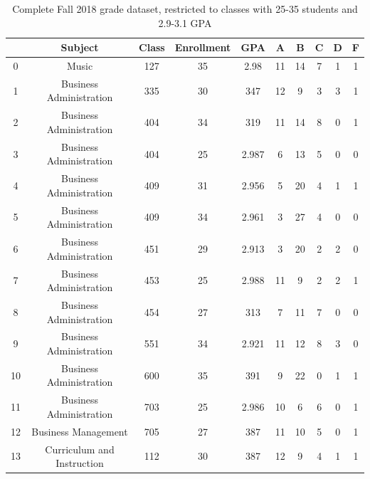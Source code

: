 \documentclass[12pt,letterpaper,oneside,openany]{book}
\begin{document}
\begin{center}
	
	\begin{longtable}{c||ccccccccc}
		\caption{Complete Fall 2018 grade dataset, restricted to classes with 25-35 students and 2.9-3.1 GPA} \\
		\label{tab:fullfall2018} 
		& Subject               & Class & Enrollment & GPA   & A    & B    & C   & D   & F   \\ \hline
		\endfirsthead
		\endhead
		0  & Music                           & 127   & 35                & 2.98  & 11 & 14 & 7 & 1 & 1 \\
		1  & Business Administration         & 335   & 30                & 347 & 12 & 9  & 3 & 3 & 1 \\
		2  & Business Administration         & 404   & 34                & 319 & 11 & 14 & 8 & 0 & 1 \\
		3  & Business Administration         & 404   & 25                & 2.987 & 6  & 13 & 5 & 0 & 0 \\
		4  & Business Administration         & 409   & 31                & 2.956 & 5  & 20 & 4 & 1 & 1 \\
		5  & Business Administration         & 409   & 34                & 2.961 & 3  & 27 & 4 & 0 & 0 \\
		6  & Business Administration         & 451   & 29                & 2.913 & 3  & 20 & 2 & 2 & 0 \\
		7  & Business Administration         & 453   & 25                & 2.988 & 11 & 9  & 2 & 2 & 1 \\
		8  & Business Administration         & 454   & 27                & 313 & 7  & 11 & 7 & 0 & 0 \\
		9  & Business Administration         & 551   & 34                & 2.921 & 11 & 12 & 8 & 3 & 0 \\
		10 & Business Administration         & 600   & 35                & 391 & 9  & 22 & 0 & 1 & 1 \\
		11 & Business Administration         & 703   & 25                & 2.986 & 10 & 6  & 6 & 0 & 1 \\
		12 & Business Management             & 705   & 27                & 387 & 11 & 10 & 5 & 0 & 1 \\
		13 & Curriculum and Instruction      & 112   & 30                & 387 & 12 & 9  & 4 & 1 & 1 \\

\end{longtable}
\end{center}
\end{document}
